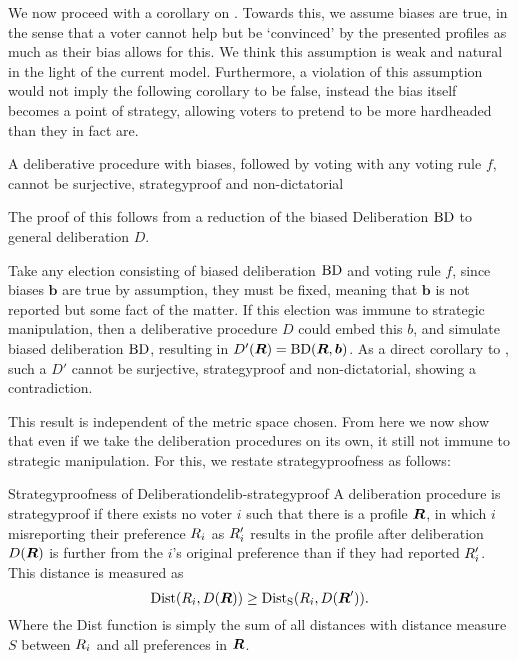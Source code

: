 We now proceed with a corollary on
. Towards this, we assume biases
are true, in the sense that a voter cannot help but be `convinced' by
the presented profiles as much as their bias allows for this. We think
this assumption is weak and natural in the light of the current
model. Furthermore, a violation of this assumption would not imply the
following corollary to be false, instead the bias itself becomes a
point of strategy, allowing voters to pretend to be more hardheaded
than they in fact are.

\begin{corollary} A deliberative procedure with biases, followed by
	voting with any voting rule $f$, cannot be surjective,
	strategyproof and non-dictatorial

	\label{corollary:biased-delib} \end{corollary}

The proof of this follows from a reduction of the biased Deliberation
$\operatorname{BD}$ to general deliberation $D$.

\begin{proofc}{} Take any election consisting of biased deliberation
	$\operatorname{BD}$ and voting rule $f$, since biases
	$\boldsymbol{b}$ are true by assumption, they must be fixed,
	meaning that $\boldsymbol{b}$ is not reported but some fact of
	the matter. If this election was immune to strategic
	manipulation, then a deliberative procedure $D$ could embed
	this $b$, and simulate biased deliberation
	$\operatorname{BD}$, resulting in $D'(\boldsymbol{R}) =
		\operatorname{BD}(\boldsymbol{R}, \boldsymbol{b})$. As a
	direct corollary to ,
	such a $D'$ cannot be surjective, strategyproof and
	non-dictatorial, showing a contradiction. \end{proofc}

This result is independent of the metric space chosen. From
here we now show that even if we take the deliberation
procedures on its own, it still not immune to strategic
manipulation. For this, we restate strategyproofness as follows:

\begin{definition}{Strategyproofness of
		Deliberation}{delib-strategyproof} A deliberation
	procedure is strategyproof if there exists no voter $i$
	such that there is a profile $\boldsymbol{R}$, in which
	$i$ misreporting their preference $R_{i}$ as
	$R_{i}'$ results in the profile after
	deliberation $D(\boldsymbol{R})$ is further from the
	$i$'s original preference than if they had reported
	$R_{i}'$. This distance is measured as
	\[\operatorname{Dist}(R_{i},
		D(\boldsymbol{R})) \geq
		\operatorname{Dist}_{\text{S}}(R_{i}, D(\boldsymbol{R}')).\]
	Where the Dist function is simply the sum of all distances with distance measure $S$
	between $R_i$ and all preferences in
	$\boldsymbol{R}$. \end{definition}

